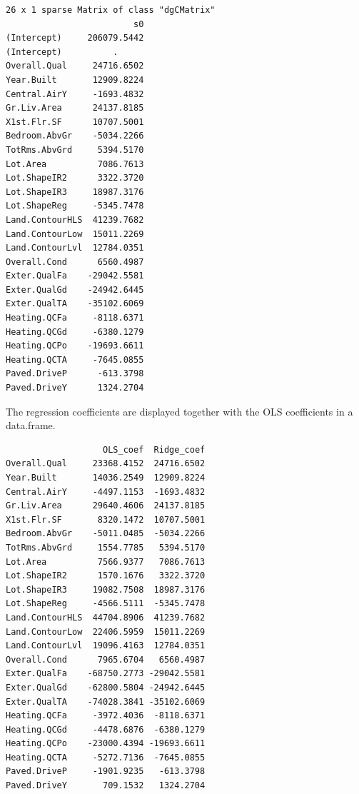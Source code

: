 \documentclass[
  letterpaper,
  DIV=11,
  numbers=noendperiod]{scrreprt}
\newenvironment{Shaded}{\begin{snugshade}}{\end{snugshade}}
\newcommand{\CommentTok}[1]{\textcolor[rgb]{0.37,0.37,0.37}{#1}}
\newcommand{\DecValTok}[1]{\textcolor[rgb]{0.68,0.00,0.00}{#1}}
\newcommand{\FunctionTok}[1]{\textcolor[rgb]{0.28,0.35,0.67}{#1}}
\newcommand{\NormalTok}[1]{\textcolor[rgb]{0.00,0.23,0.31}{#1}}
\newcommand{\OtherTok}[1]{\textcolor[rgb]{0.00,0.23,0.31}{#1}}
\newcommand{\SpecialCharTok}[1]{\textcolor[rgb]{0.37,0.37,0.37}{#1}}
\begin{document}
\begin{verbatim}
26 x 1 sparse Matrix of class "dgCMatrix"
                         s0
(Intercept)     206079.5442
(Intercept)          .     
Overall.Qual     24716.6502
Year.Built       12909.8224
Central.AirY     -1693.4832
Gr.Liv.Area      24137.8185
X1st.Flr.SF      10707.5001
Bedroom.AbvGr    -5034.2266
TotRms.AbvGrd     5394.5170
Lot.Area          7086.7613
Lot.ShapeIR2      3322.3720
Lot.ShapeIR3     18987.3176
Lot.ShapeReg     -5345.7478
Land.ContourHLS  41239.7682
Land.ContourLow  15011.2269
Land.ContourLvl  12784.0351
Overall.Cond      6560.4987
Exter.QualFa    -29042.5581
Exter.QualGd    -24942.6445
Exter.QualTA    -35102.6069
Heating.QCFa     -8118.6371
Heating.QCGd     -6380.1279
Heating.QCPo    -19693.6611
Heating.QCTA     -7645.0855
Paved.DriveP      -613.3798
Paved.DriveY      1324.2704
\end{verbatim}

The regression coefficients are displayed together with the OLS
coefficients in a data.frame.

\begin{Shaded}
\end{Shaded}

\begin{verbatim}
                   OLS_coef  Ridge_coef
Overall.Qual     23368.4152  24716.6502
Year.Built       14036.2549  12909.8224
Central.AirY     -4497.1153  -1693.4832
Gr.Liv.Area      29640.4606  24137.8185
X1st.Flr.SF       8320.1472  10707.5001
Bedroom.AbvGr    -5011.0485  -5034.2266
TotRms.AbvGrd     1554.7785   5394.5170
Lot.Area          7566.9377   7086.7613
Lot.ShapeIR2      1570.1676   3322.3720
Lot.ShapeIR3     19082.7508  18987.3176
Lot.ShapeReg     -4566.5111  -5345.7478
Land.ContourHLS  44704.8906  41239.7682
Land.ContourLow  22406.5959  15011.2269
Land.ContourLvl  19096.4163  12784.0351
Overall.Cond      7965.6704   6560.4987
Exter.QualFa    -68750.2773 -29042.5581
Exter.QualGd    -62800.5804 -24942.6445
Exter.QualTA    -74028.3841 -35102.6069
Heating.QCFa     -3972.4036  -8118.6371
Heating.QCGd     -4478.6876  -6380.1279
Heating.QCPo    -23000.4394 -19693.6611
Heating.QCTA     -5272.7136  -7645.0855
Paved.DriveP     -1901.9235   -613.3798
Paved.DriveY       709.1532   1324.2704
\end{verbatim}
\end{document}

